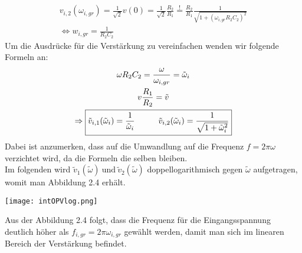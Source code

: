 \begin{gather}
    v_{i,2}(\omega_{i,gr}) = \frac{1}{\sqrt{2}} v(0) = \frac{1}{\sqrt{2}} \frac{R_2}{R_1} \overset{!}{=} \frac{R_2}{R_1} \frac{1}{\sqrt{1+(\omega_{i,gr} R_2 C_2)^2}}\\
    \Leftrightarrow \boxed{w_{i,gr} = \frac{1}{R_2 C_2}}
    \label{eq:wi2}
\end{gather}
Um die Ausdrücke für die Verstärkung zu vereinfachen wenden wir folgende Formeln an:
\begin{gather}
    \omega R_2 C_2 = \frac{\omega}{\omega_{i,gr}} = \tilde{\omega}_i\\
    v\frac{R_1}{R_2}=\tilde{v}\\
    \Rightarrow \boxed{\tilde{v}_{i,1}(\tilde{\omega}_i) = \frac{1}{\tilde{\omega}_i} \hspace*{1cm} \tilde{v}_{i,2}(\tilde{\omega}_i) =\frac{1}{\sqrt{1+\tilde{\omega}_i^2}}}
\end{gather}
Dabei ist anzumerken, dass auf die Umwandlung auf die Frequenz $f=2\pi\omega$ verzichtet wird, da die Formeln die selben bleiben.\\
Im folgenden wird $\tilde{v}_1(\tilde{\omega})~\text{und}~\tilde{v}_{2}(\tilde{\omega})$ doppellogarithmisch gegen $\tilde{\omega}$ aufgetragen, womit man Abbildung 2.4 erhält.
\begin{center}
    \texttt{[image: intOPVlog.png]}
\end{center}
Aus der Abbildung 2.4 folgt, dass die Frequenz für die Eingangsspannung deutlich höher als $f_{i,gr}=2\pi\omega_{i,gr}$ gewählt werden, damit man sich im linearen Bereich der Verstärkung befindet.

